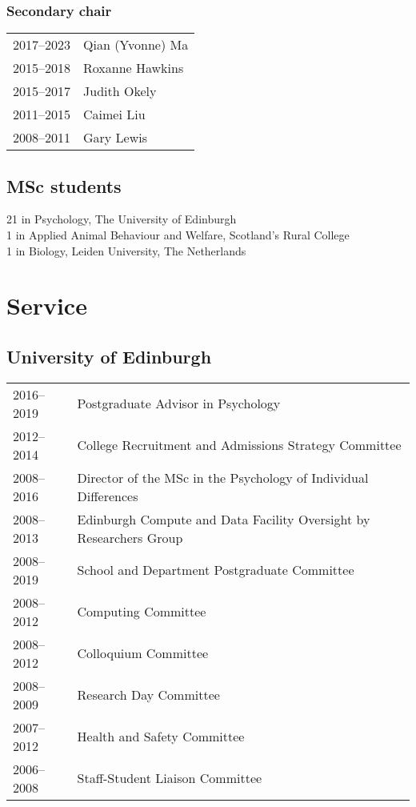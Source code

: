 \documentclass[11pt]{article}
\begin{document}
\subsubsection*{Secondary chair}
\begin{tabular}{p{3cm}p{12cm}}
2017--2023 & Qian (Yvonne) Ma \\
2015--2018 & Roxanne Hawkins \\
2015--2017 & Judith Okely \\
2011--2015 & Caimei Liu \\
2008--2011 & Gary Lewis
\end{tabular}

\subsection*{MSc students}
21 in Psychology, The University of Edinburgh \\
1 in Applied Animal Behaviour and Welfare, Scotland's Rural College \\
1 in Biology, Leiden University, The Netherlands

\section*{Service}

\subsection*{University of Edinburgh}
\begin{tabular}{p{3cm}p{12cm}}
2016--2019 & Postgraduate Advisor in Psychology \\
2012--2014 & College Recruitment and Admissions Strategy Committee \\
2008--2016 & Director of the MSc in the Psychology of Individual
Differences \\
2008--2013 & Edinburgh Compute and Data Facility Oversight by
Researchers Group \\
2008--2019 & School and Department Postgraduate Committee \\
2008--2012 & Computing Committee \\
2008--2012 & Colloquium Committee \\
2008--2009 & Research Day Committee \\
2007--2012 & Health and Safety Committee \\
2006--2008 & Staff-Student Liaison Committee
\end{tabular}
\end{document}
